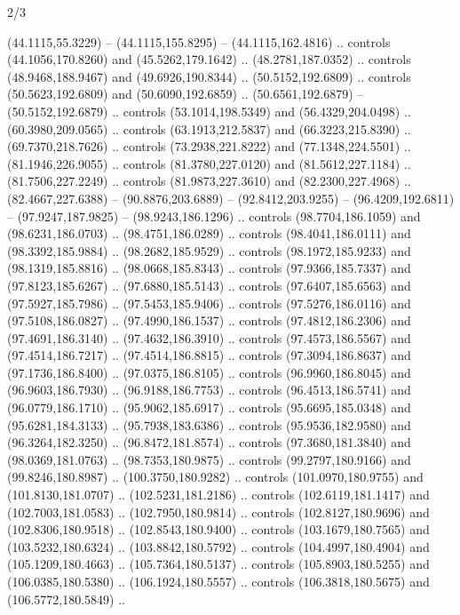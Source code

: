 \begin{flagdescription}{2/3}
\begin{scope}[shift={(0.5\flaglength,0.5)},scale=\flagwidth/320]
\begin{scope}[y=0.8pt, x=0.8pt, yscale=-1,shift={(-118.3,-146)}]
\path[fill=gold,line width=0.253\lw] %
 (44.1115,55.3229) -- (44.1115,155.8295)
  -- (44.1115,162.4816) .. controls (44.1056,170.8260) and (45.5262,179.1642) ..
  (48.2781,187.0352) .. controls (48.9468,188.9467) and (49.6926,190.8344) ..
  (50.5152,192.6809) .. controls (50.5623,192.6809) and (50.6090,192.6859) ..
  (50.6561,192.6879) -- (50.5152,192.6879) .. controls (53.1014,198.5349) and
  (56.4329,204.0498) .. (60.3980,209.0565) .. controls (63.1913,212.5837) and
  (66.3223,215.8390) .. (69.7370,218.7626) .. controls (73.2938,221.8222) and
  (77.1348,224.5501) .. (81.1946,226.9055) .. controls (81.3780,227.0120) and
  (81.5612,227.1184) .. (81.7506,227.2249) .. controls (81.9873,227.3610) and
  (82.2300,227.4968) .. (82.4667,227.6388) -- (90.8876,203.6889) --
  (92.8412,203.9255) -- (96.4209,192.6811) -- (97.9247,187.9825) --
  (98.9243,186.1296) .. controls (98.7704,186.1059) and (98.6231,186.0703) ..
  (98.4751,186.0289) .. controls (98.4041,186.0111) and (98.3392,185.9884) ..
  (98.2682,185.9529) .. controls (98.1972,185.9233) and (98.1319,185.8816) ..
  (98.0668,185.8343) .. controls (97.9366,185.7337) and (97.8123,185.6267) ..
  (97.6880,185.5143) .. controls (97.6407,185.6563) and (97.5927,185.7986) ..
  (97.5453,185.9406) .. controls (97.5276,186.0116) and (97.5108,186.0827) ..
  (97.4990,186.1537) .. controls (97.4812,186.2306) and (97.4691,186.3140) ..
  (97.4632,186.3910) .. controls (97.4573,186.5567) and (97.4514,186.7217) ..
  (97.4514,186.8815) .. controls (97.3094,186.8637) and (97.1736,186.8400) ..
  (97.0375,186.8105) .. controls (96.9960,186.8045) and (96.9603,186.7930) ..
  (96.9188,186.7753) .. controls (96.4513,186.5741) and (96.0779,186.1710) ..
  (95.9062,185.6917) .. controls (95.6695,185.0348) and (95.6281,184.3133) ..
  (95.7938,183.6386) .. controls (95.9536,182.9580) and (96.3264,182.3250) ..
  (96.8472,181.8574) .. controls (97.3680,181.3840) and (98.0369,181.0763) ..
  (98.7353,180.9875) .. controls (99.2797,180.9166) and (99.8246,180.8987) ..
  (100.3750,180.9282) .. controls (101.0970,180.9755) and (101.8130,181.0707) ..
  (102.5231,181.2186) .. controls (102.6119,181.1417) and (102.7003,181.0583) ..
  (102.7950,180.9814) .. controls (102.8127,180.9696) and (102.8306,180.9518) ..
  (102.8543,180.9400) .. controls (103.1679,180.7565) and (103.5232,180.6324) ..
  (103.8842,180.5792) .. controls (104.4997,180.4904) and (105.1209,180.4663) ..
  (105.7364,180.5137) .. controls (105.8903,180.5255) and (106.0385,180.5380) ..
  (106.1924,180.5557) .. controls (106.3818,180.5675) and (106.5772,180.5849) ..

\end{scope}
\end{scope}
\end{flagdescription}
